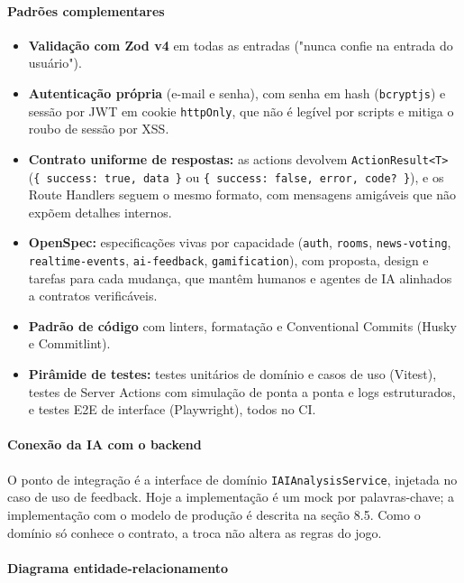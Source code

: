 \documentclass[
  brazilian,
  11pt,
]{article}
\providecommand{\tightlist}{%
  \setlength{\itemsep}{0pt}\setlength{\parskip}{0pt}}
\begin{document}
\paragraph{Padrões complementares}\label{padruxf5es-complementares}

\begin{itemize}
\tightlist
\item
  \textbf{Validação com Zod v4} em todas as entradas ("nunca confie na entrada do usuário").
\item
  \textbf{Autenticação própria} (e-mail e senha), com senha em hash (\texttt{bcryptjs}) e sessão por JWT em cookie \texttt{httpOnly}, que não é legível por scripts e mitiga o roubo de sessão por XSS.
\item
  \textbf{Contrato uniforme de respostas:} as actions devolvem \texttt{ActionResult\textless{}T\textgreater{}} (\texttt{\{\ success:\ true,\ data\ \}} ou \texttt{\{\ success:\ false,\ error,\ code?\ \}}), e os Route Handlers seguem o mesmo formato, com mensagens amigáveis que não expõem detalhes internos.
\item
  \textbf{OpenSpec:} especificações vivas por capacidade (\texttt{auth}, \texttt{rooms}, \texttt{news-voting}, \texttt{realtime-events}, \texttt{ai-feedback}, \texttt{gamification}), com proposta, design e tarefas para cada mudança, que mantêm humanos e agentes de IA alinhados a contratos verificáveis.
\item
  \textbf{Padrão de código} com linters, formatação e Conventional Commits (Husky e Commitlint).
\item
  \textbf{Pirâmide de testes:} testes unitários de domínio e casos de uso (Vitest), testes de Server Actions com simulação de ponta a ponta e logs estruturados, e testes E2E de interface (Playwright), todos no CI.
\end{itemize}

\paragraph{Conexão da IA com o backend}\label{conexuxe3o-da-ia-com-o-backend}

O ponto de integração é a interface de domínio \texttt{IAIAnalysisService}, injetada no caso de uso de feedback. Hoje a implementação é um mock por palavras-chave; a implementação com o modelo de produção é descrita na seção 8.5. Como o domínio só conhece o contrato, a troca não altera as regras do jogo.

\paragraph{Diagrama entidade-relacionamento}\label{diagrama-entidade-relacionamento}
\end{document}
